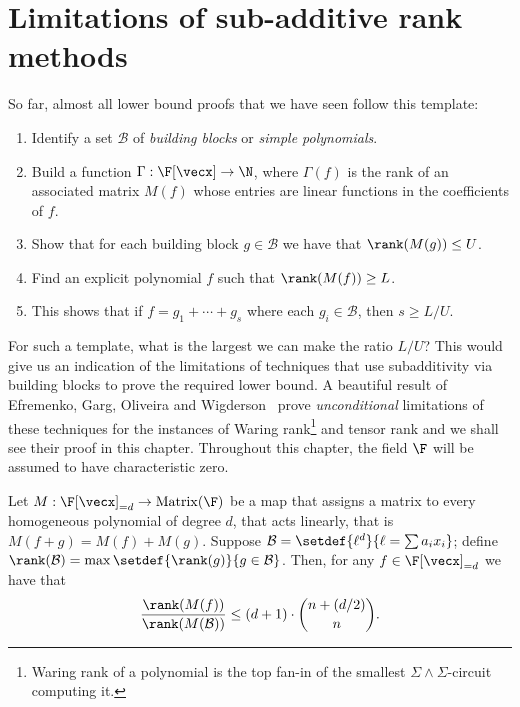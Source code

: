 \chapter{Limitations of sub-additive rank methods}\label{chap:subadditive-rank-barrier}

So far, almost all lower bound proofs that we have seen follow this template:

\begin{enumerate}
\item Identify a set $\mathcal{B}$ of \emph{building blocks} or \emph{simple polynomials}.
\item Build a function $\Gamma: \F[\vecx] \rightarrow \N$, where $\Gamma(f)$ is the rank of an associated matrix $M(f)$ whose entries are linear functions in the coefficients of $f$.
\item Show that for each building block $g \in \mathcal{B}$ we have that $\rank(M(g)) \leq U$.
\item Find an explicit polynomial $f$ such that $\rank(M(f)) \geq L$.
\item This shows that if $f = g_1 + \cdots + g_s$ where each $g_i \in \mathcal{B}$, then $s \geq L/U$. 
\end{enumerate}

\noindent
For such a template, what is the largest we can make the ratio $L/U$? This would give us an indication of the limitations of techniques that use subadditivity via building blocks to prove the required lower bound. A beautiful result of Efremenko, Garg, Oliveira and Wigderson~\cite{EGOW18} prove \emph{unconditional} limitations of these techniques for the instances of Waring rank\footnote{Waring rank of a polynomial is the top fan-in of the smallest $\Sigma\!\wedge\!\Sigma$-circuit computing it.} and tensor rank and we shall see their proof in this chapter. Throughout this chapter, the field $\F$ will be assumed to have characteristic zero.
\begin{theorem}\label{thm:limitations-waring-rank}
  Let $M: \F[\vecx]_{= d} \rightarrow \operatorname{Matrix}(\F)$ be a map that assigns a matrix to every homogeneous polynomial of degree  $d$,  that acts linearly, that is $M(f + g) = M(f) + M(g)$. Suppose $\mathcal{B} = \setdef{\ell^d}{\ell = \sum a_i x_i}$; define $\rank(\mathcal{B}) = \max\setdef{\rank(g)}{g\in \mathcal{B}}$. Then, for any $f \in \F[\vecx]_{=d}$ we have that
  \[
    \frac{\rank(M(f))}{\rank(M(\mathcal{B}))} \leq (d+1) \cdot \binom{n+(d/2)}{n}. 
  \]
\end{theorem}

